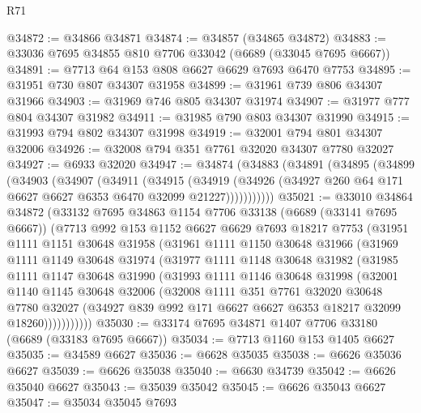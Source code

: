 \begin{lexlean}{R71}
\begin{coremodule}
@34872 := @34866 @34871
@34874 := @34857 (@34865 @34872)
@34883 := @33036 @7695 @34855 @810 @7706 @33042 (@6689 (@33045 @7695 @6667))
@34891 := @7713 @64 @153 @808 @6627 @6629 @7693 @6470 @7753
@34895 := @31951 @730 @807 @34307 @31958
@34899 := @31961 @739 @806 @34307 @31966
@34903 := @31969 @746 @805 @34307 @31974
@34907 := @31977 @777 @804 @34307 @31982
@34911 := @31985 @790 @803 @34307 @31990
@34915 := @31993 @794 @802 @34307 @31998
@34919 := @32001 @794 @801 @34307 @32006
@34926 := @32008 @794 @351 @7761 @32020 @34307 @7780 @32027
@34927 := @6933 @32020
@34947 := @34874
    (@34883
      (@34891
        (@34895
          (@34899
            (@34903
              (@34907
                (@34911
                  (@34915
                    (@34919
                      (@34926 (@34927 @260 @64 @171 @6627 @6627 @6353 @6470 @32099 @21227)))))))))))
@35021 := @33010
    @34864
    @34872
    (@33132
      @7695
      @34863
      @1154
      @7706
      @33138
      (@6689 (@33141 @7695 @6667))
      (@7713
        @992
        @153
        @1152
        @6627
        @6629
        @7693
        @18217
        @7753
        (@31951
          @1111
          @1151
          @30648
          @31958
          (@31961
            @1111
            @1150
            @30648
            @31966
            (@31969
              @1111
              @1149
              @30648
              @31974
              (@31977
                @1111
                @1148
                @30648
                @31982
                (@31985
                  @1111
                  @1147
                  @30648
                  @31990
                  (@31993
                    @1111
                    @1146
                    @30648
                    @31998
                    (@32001
                      @1140
                      @1145
                      @30648
                      @32006
                      (@32008
                        @1111
                        @351
                        @7761
                        @32020
                        @30648
                        @7780
                        @32027
                        (@34927 @839 @992 @171 @6627 @6627 @6353 @18217 @32099 @18260)))))))))))
@35030 := @33174 @7695 @34871 @1407 @7706 @33180 (@6689 (@33183 @7695 @6667))
@35034 := @7713 @1160 @153 @1405 @6627
@35035 := @34589 @6627
@35036 := @6628 @35035
@35038 := @6626 @35036 @6627
@35039 := @6626 @35038
@35040 := @6630 @34739
@35042 := @6626 @35040 @6627
@35043 := @35039 @35042
@35045 := @6626 @35043 @6627
@35047 := @35034 @35045 @7693

\end{coremodule}
\end{lexlean}
